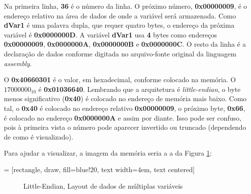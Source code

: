 Na primeira linha, \textbf{36} é o número da linha. O próximo número, \textbf{0x00000009}, é o endereço relativo na área de dados de onde a variável será armazenada. Como \textbf{dVar1} é uma palavra dupla, que requer quatro bytes, o endereço da próxima variável é \textbf{0x0000000D}. A variável \textbf{dVar1} usa \textbf{4} bytes como endereços \textbf{0x00000009}, \textbf{0x0000000A}, \textbf{0x0000000B} e \textbf{0x0000000C}. O resto da linha é a declaração de dados conforme digitada no arquivo-fonte original da linguagem \textit{assembly}.

O \textbf{0x40660301} é o valor, em hexadecimal, conforme colocado na memória. O \textbf{$ 17000000_{10} $}  é \textbf{0x01036640}. Lembrando que a arquitetura é \textit{little-endian}, o byte menos significativo (\textbf{0x40}) é colocado no endereço de memória mais baixo. Como tal, o \textbf{0x40} é colocado no endereço relativo \textbf{0x00000009}, o próximo byte, \textbf{0x66}, é colocado no endereço \textbf{0x0000000A} e assim por diante. Isso pode ser confuso, pois à primeira vista o número pode aparecer invertido ou truncado (dependendo de como é visualizado).

Para ajudar a visualizar, a imagem da memória seria a a da Figura \ref{fig:litllelayout}:

 = [rectangle, draw, fill=blue!20, 
text width=4em, text centered]

\begin{figure}[h]
\begin{center}
\end{center}
	\caption{Little-Endian, Layout de dados de múltiplas variáveis}
	\label{fig:litllelayout}
\end{figure}

